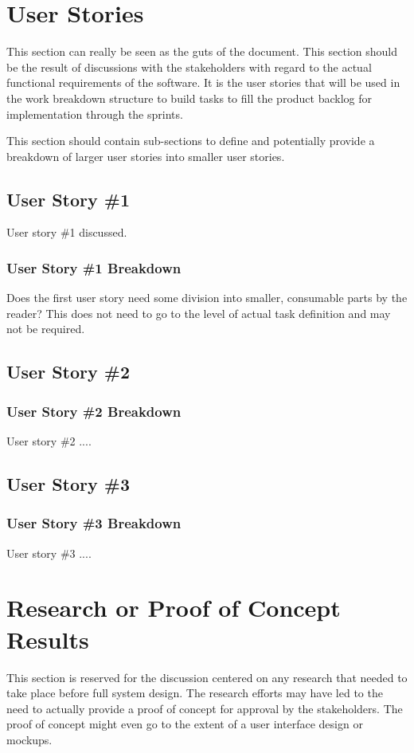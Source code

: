 \section{User Stories}
This section can really be seen as the guts of the document.  This section should 
be the result of discussions with the stakeholders with regard to the actual functional 
requirements of the software.  It is the user stories that will be used in the 
work breakdown structure to build tasks to fill the product backlog for implementation 
through the sprints.

This section should contain sub-sections to define and potentially provide a breakdown 
of larger user stories into smaller user stories. 



\subsection{User Story \#1}
User story \#1 discussed. 

\subsubsection{User Story \#1 Breakdown}
Does the first user story need some division into smaller, consumable parts by 
the reader?  This does not need to go to the level of actual task definition and 
may not be required. 

\subsection{User Story \#2} 

\subsubsection{User Story \#2 Breakdown}
User story \#2  .... 

\subsection{User Story \#3} 

\subsubsection{User Story \#3 Breakdown}
User story \#3  .... 


\section{Research or Proof of Concept Results}
This section is reserved for the discussion centered on any research that needed 
to take place before full system design.  The research efforts may have led to 
the need to actually provide a proof of concept for approval by the stakeholders. 
 The proof of concept might even go to the extent of a user interface design or 
mockups. 


